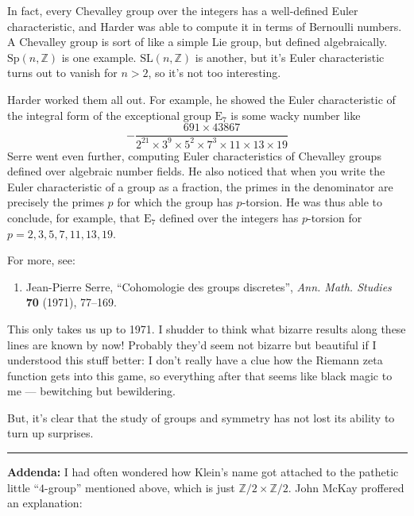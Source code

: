 \documentclass{article}
\def\tightlist{}
\begin{document}
In fact, every Chevalley group over the integers has a well-defined
Euler characteristic, and Harder was able to compute it in terms of
Bernoulli numbers. A Chevalley group is sort of like a simple Lie group,
but defined algebraically. \(\mathrm{Sp}(n,\mathbb{Z})\) is one example.
\(\mathrm{SL}(n,\mathbb{Z})\) is another, but it's Euler characteristic
turns out to vanish for \(n > 2\), so it's not too interesting.

Harder worked them all out. For example, he showed the Euler
characteristic of the integral form of the exceptional group
\(\mathrm{E}_7\) is some wacky number like
\[- \frac{691 \times 43867}{2^{21} \times 3^9 \times 5^2 \times 7^3 \times 11 \times 13 \times 19}\]
Serre went even further, computing Euler characteristics of Chevalley
groups defined over algebraic number fields. He also noticed that when
you write the Euler characteristic of a group as a fraction, the primes
in the denominator are precisely the primes \(p\) for which the group
has \(p\)-torsion. He was thus able to conclude, for example, that
\(\mathrm{E}_7\) defined over the integers has \(p\)-torsion for
\(p = 2, 3, 5, 7, 11, 13, 19\).

For more, see:

\begin{enumerate}
\def\labelenumi{\arabic{enumi})}
\setcounter{enumi}{10}
\tightlist
\item
  Jean-Pierre Serre, ``Cohomologie des groups discretes'', \emph{Ann.
  Math. Studies} \textbf{70} (1971), 77--169.
\end{enumerate}

This only takes us up to 1971. I shudder to think what bizarre results
along these lines are known by now! Probably they'd seem not bizarre but
beautiful if I understood this stuff better: I don't really have a clue
how the Riemann zeta function gets into this game, so everything after
that seems like black magic to me --- bewitching but bewildering.

But, it's clear that the study of groups and symmetry has not lost its
ability to turn up surprises.

\begin{center}\rule{0.5\linewidth}{0.5pt}\end{center}

\textbf{Addenda:} I had often wondered how Klein's name got attached to
the pathetic little ``\(4\)-group'' mentioned above, which is just
\(\mathbb{Z}/2 \times \mathbb{Z}/2.\) John McKay proffered an
explanation:
\end{document}
